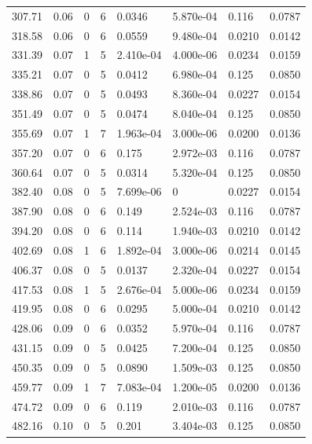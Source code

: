 \documentclass[preview]{standalone}
\begin{document}
{{{\begin{tabular}{L{1.2cm}C{1.2cm} C{0.3cm}C{0.5cm} C{1.4cm}C{1.4cm} C{1.4cm}C{1.4cm}}
  307.71  &  0.06  & 0     &  6 &  0.0346  & 5.870e-04  & 0.116 &  0.0787   \\ 
  318.58  &  0.06  & 0     &  6 &  0.0559  & 9.480e-04  & 0.0210 &  0.0142   \\ 
  331.39  &  0.07  & 1     &  5 &  2.410e-04  & 4.000e-06  & 0.0234 &  0.0159   \\ 
  335.21  &  0.07  & 0     &  5 &  0.0412  & 6.980e-04  & 0.125 &  0.0850   \\ 
  338.86  &  0.07  & 0     &  5 &  0.0493  & 8.360e-04  & 0.0227 &  0.0154   \\ 
  351.49  &  0.07  & 0     &  5 &  0.0474  & 8.040e-04  & 0.125 &  0.0850   \\ 
  355.69  &  0.07  & 1     &  7 &  1.963e-04  & 3.000e-06  & 0.0200 &  0.0136   \\ 
  357.20  &  0.07  & 0     &  6 &  0.175  & 2.972e-03  & 0.116 &  0.0787   \\ 
  360.64  &  0.07  & 0     &  5 &  0.0314  & 5.320e-04  & 0.125 &  0.0850   \\ 
  382.40  &  0.08  & 0     &  5 &  7.699e-06  & 0  & 0.0227 &  0.0154   \\ 
  387.90  &  0.08  & 0     &  6 &  0.149  & 2.524e-03  & 0.116 &  0.0787   \\ 
  394.20  &  0.08  & 0     &  6 &  0.114  & 1.940e-03  & 0.0210 &  0.0142   \\ 
  402.69  &  0.08  & 1     &  6 &  1.892e-04  & 3.000e-06  & 0.0214 &  0.0145   \\ 
  406.37  &  0.08  & 0     &  5 &  0.0137  & 2.320e-04  & 0.0227 &  0.0154   \\ 
  417.53  &  0.08  & 1     &  5 &  2.676e-04  & 5.000e-06  & 0.0234 &  0.0159   \\ 
  419.95  &  0.08  & 0     &  6 &  0.0295  & 5.000e-04  & 0.0210 &  0.0142   \\ 
  428.06  &  0.09  & 0     &  6 &  0.0352  & 5.970e-04  & 0.116 &  0.0787   \\ 
  431.15  &  0.09  & 0     &  5 &  0.0425  & 7.200e-04  & 0.125 &  0.0850   \\ 
  450.35  &  0.09  & 0     &  5 &  0.0890  & 1.509e-03  & 0.125 &  0.0850   \\ 
  459.77  &  0.09  & 1     &  7 &  7.083e-04  & 1.200e-05  & 0.0200 &  0.0136   \\ 
  474.72  &  0.09  & 0     &  6 &  0.119  & 2.010e-03  & 0.116 &  0.0787   \\ 
  482.16  &  0.10  & 0     &  5 &  0.201  & 3.404e-03  & 0.125 &  0.0850   \\ 

\end{tabular}}}}
\end{document}
